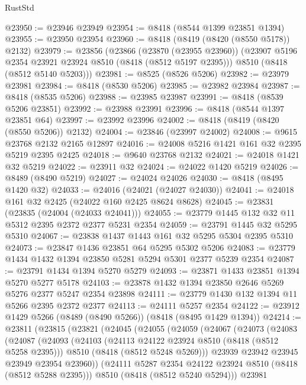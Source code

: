 \begin{lexlean}{RustStd}
\begin{coremodule}
@23950 := @23946 @23949
@23954 := @8418 (@8544 @1399 @23851 @1394)
@23955 := @23950 @23954
@23960 := @8418 (@8419 (@8420 (@8550 @5178)) @2132)
@23979 := @23856
    (@23866
      (@23870 (@23955 @23960))
      (@23907 @5196 @2354 @23921 @23924 @8510 (@8418 (@8512 @5197 @2395)))
      @8510
      (@8418 (@8512 @5140 @5203)))
@23981 := @8525 (@8526 @5206)
@23982 := @23979 @23981
@23984 := @8418 (@8530 @5206)
@23985 := @23982 @23984
@23987 := @8418 (@8535 @5206)
@23988 := @23985 @23987
@23991 := @8418 (@8539 @5206 @23851)
@23992 := @23988 @23991
@23996 := @8418 (@8544 @1397 @23851 @64)
@23997 := @23992 @23996
@24002 := @8418 (@8419 (@8420 (@8550 @5206)) @2132)
@24004 := @23846 (@23997 @24002)
@24008 := @9615 @23768 @2132 @2165 @12897
@24016 := @24008 @5216 @1421 @161 @32 @2395 @5219 @2395 @2425
@24018 := @9640 @23768 @2132
@24021 := @24018 @1421 @32 @5219
@24022 := @23911 @32
@24024 := @24022 @1420 @5219
@24026 := @8489 (@8490 @5219)
@24027 := @24024 @24026
@24030 := @8418 (@8495 @1420 @32)
@24033 := @24016 (@24021 (@24027 @24030))
@24041 := @24018 @161 @32 @2425 (@24022 @160 @2425 @8624 @8628)
@24045 := @23831 (@23835 (@24004 (@24033 @24041)))
@24055 := @23779 @1445 @132 @32 @11 @5312 @2395 @2372 @2377 @5231 @2354
@24059 := @23791 @1445 @32 @5295 @5310
@24067 := @23838 @1437 @1443 @161 @32 @5295 @5304 @2395 @5310
@24073 := @23847 @1436 @23851 @64 @5295 @5302 @5206
@24083 := @23779 @1434 @1432 @1394 @23850 @5281 @5294 @5301 @2377 @5239 @2354
@24087 := @23791 @1434 @1394 @5270 @5279
@24093 := @23871 @1433 @23851 @1394 @5270 @5277 @5178
@24103 := @23878 @1432 @1394 @23850 @2646 @5269 @5276 @2377 @5247 @2354 @23898
@24111 := @23779 @1430 @132 @1394 @11 @5266 @2395 @2372 @2377
@24113 := @24111 @5257 @2354
@24122 := @23912 @1429 @5266 (@8489 (@8490 @5266)) (@8418 (@8495 @1429 @1394))
@24214 := @23811
    (@23815
      (@23821
        (@24045
          (@24055
            (@24059
              (@24067
                (@24073
                  (@24083
                    (@24087
                      (@24093
                        (@24103
                          (@24113 @24122 @23924 @8510 (@8418 (@8512 @5258 @2395)))
                          @8510
                          (@8418 (@8512 @5248 @5269)))
                        @23939
                        @23942
                        @23945
                        @23949
                        @23954
                        @23960))
                    (@24111 @5287 @2354 @24122 @23924 @8510 (@8418 (@8512 @5288 @2395)))
                    @8510
                    (@8418 (@8512 @5240 @5294)))
                  @23981

\end{coremodule}
\end{lexlean}
